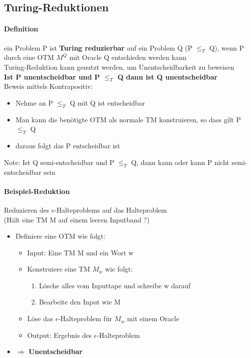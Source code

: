 \documentclass[12pt,a4paper]{article}
\begin{document}
\subsection{Turing-Reduktionen}
\paragraph{Definition}
\flushleft
ein Problem P ist \textbf{Turing reduzierbar} auf ein Problem Q (P $\leq_T$ Q), wenn P durch eine OTM $M^Q$ mit Oracle Q entschieden werden kann\\
Turing-Reduktion kann genutzt werden, um Unentscheidbarkeit zu beweisen\\
\textbf{Ist P unentscheidbar und P $\leq_T$ Q dann ist Q unentscheidbar}\\
Beweis mittels Kontrapositiv:
\begin{itemize}
\item Nehme an P $\leq_T$ Q mit Q ist entscheidbar
\item Man kann die benötigte OTM als normale TM konstruieren, so dass gilt P $\leq_T$ Q
\item daraus folgt das P entscheidbar ist
\end{itemize}
Note: Ist Q semi-entscheidbar und P $\leq_T$ Q, dann kann oder kann P nicht semi-entscheidbar sein


\paragraph{Beispiel-Reduktion}
\flushleft
Reduzieren des $\epsilon$-Halteproblems auf das Halteproblem\\
(Hält eine TM M auf einem leeren Inputband ?)
\begin{itemize}
\item Definiere eine OTM wie folgt:
\begin{itemize}
\item Input: Eine TM M und ein Wort w
\item Konstruiere eine TM $M_w$ wie folgt:
\begin{enumerate}
\item Lösche alles vom Inputtape und schreibe w darauf
\item Bearbeite den Input wie M
\end{enumerate}
\item Löse das $\epsilon$-Halteproblem für $M_w$ mit einem Oracle
\item Output: Ergebnis des $\epsilon$-Halteproblem
\end{itemize}
\item $\Rightarrow$ \textbf{Unentscheidbar}
\end{itemize}
\end{document}
